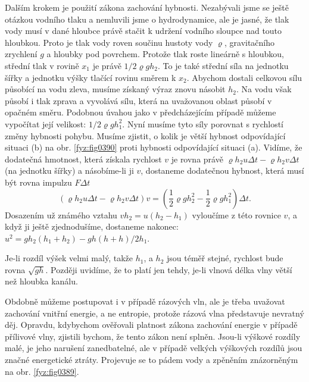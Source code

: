   Dalším krokem je použití zákona zachování hybnosti. Nezabývali jsme se ještě otázkou vodního 
  tlaku a nemluvili jsme o hydrodynamice, ale je jasné, že tlak vody musí v dané hloubce právě 
  stačit k udržení vodního sloupce nad touto hloubkou. Proto je tlak vody roven součinu hustoty 
  vody \(\varrho\), gravitačního zrychlení \(g\) a hloubky pod povrchem. Protože tlak roste 
  lineárně s hloubkou, střední tlak v rovině \(x_1\) je právě \(1/2\varrho gh_2\). To je také 
  střední síla na jednotku šířky a jednotku výšky tlačící rovinu směrem k \(x_2\). Abychom dostali 
  celkovou sílu působící na vodu zleva, musíme získaný výraz znovu násobit \(h_2\). Na vodu však 
  působí i tlak zprava a vyvolává sílu, která na uvažovanou oblast působí v opačném směru. Podobnou 
  úvahou jako v předcházejícím případě můžeme vypočítat její velikost: \(1/2\varrho gh_1^2\). Nyní 
  musíme tyto síly porovnat s rychlostí změny hybnosti pohybu. Musíme zjistit, o kolik je větší 
  hybnost odpovídající situaci (b) na obr. \ref{fyz:fig0390} proti hybnosti odpovídající situaci 
  (a). Vidíme, že dodatečná hmotnost, která získala rychlost \(v\) je rovna právě \(\varrho 
  h_2u\Delta t - \varrho h_2v\Delta t\) (na jednotku šířky) a násobíme-li ji \(v\), dostaneme 
  dodatečnou hybnost, která musí být rovna impulzu \(F\Delta t\)
  \begin{equation*}
    (\varrho h_2u\Delta t - \varrho h_2v\Delta t) v
      = \left(\dfrac{1}{2}\varrho g h_2^2 - \dfrac{1}{2}\varrho g h_1^2\right)\Delta t.
  \end{equation*}
  Dosazením už známého vztahu \(vh_2 = u(h_2 - h_1)\) vyloučíme z této rovnice \(v\), a když ji 
  ještě zjednodušíme, dostaneme nakonec: \(u^2 = gh_2(h_1 + h_2)-gh (h+h)/2 h_1\).
  
  Je-li rozdíl výšek velmi malý, takže \(h_1\), a \(h_2\) jsou téměř stejné, rychlost bude rovna 
  \(\sqrt{gh}\). Později uvidíme, že to platí jen tehdy, je-li vlnová délka vlny větší než hloubka 
  kanálu.
  
  Obdobně můžeme postupovat i v případě rázových vln, ale je třeba uvažovat zachování vnitřní 
  energie, a ne entropie, protože rázová vlna představuje nevratný děj. Opravdu, kdybychom 
  ověřovali platnost zákona zachování energie v případě přílivové vlny, zjistili bychom, že tento 
  zákon není splněn. Jsou-li výškové rozdíly malé, je jeho narušení zanedbatelné, ale v případě 
  velkých výškových rozdílů jsou značné energetické ztráty. Projevuje se to pádem vody a zpěněním 
  znázorněným na obr. \ref{fyz:fig0389}.
  

